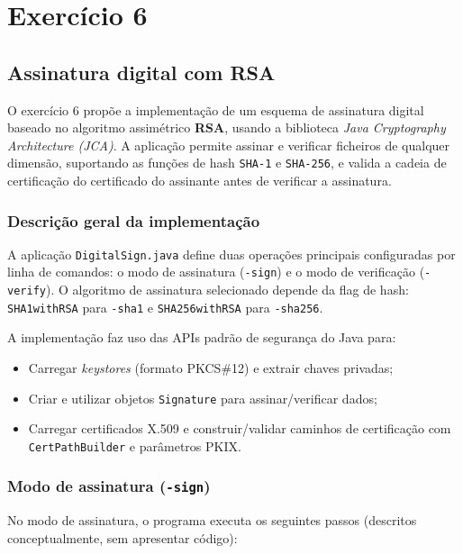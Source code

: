 \chapter{Exercício 6}
\label{cha:exercise_6}

\section{Assinatura digital com RSA}

O exercício 6 propõe a implementação de um esquema de assinatura digital baseado no algoritmo assimétrico \textbf{RSA}, usando a biblioteca \textit{Java Cryptography Architecture (JCA)}.  
A aplicação permite assinar e verificar ficheiros de qualquer dimensão, suportando as funções de hash \texttt{SHA-1} e \texttt{SHA-256}, e valida a cadeia de certificação do certificado do assinante antes de verificar a assinatura.

\subsection{Descrição geral da implementação}

A aplicação \texttt{DigitalSign.java} define duas operações principais configuradas por linha de comandos: o modo de assinatura (\texttt{-sign}) e o modo de verificação (\texttt{-verify}).  
O algoritmo de assinatura selecionado depende da flag de hash: \texttt{SHA1withRSA} para \texttt{-sha1} e \texttt{SHA256withRSA} para \texttt{-sha256}.

A implementação faz uso das APIs padrão de segurança do Java para:
\begin{itemize}
    \item Carregar \textit{keystores} (formato PKCS\#12) e extrair chaves privadas;
    \item Criar e utilizar objetos \texttt{Signature} para assinar/verificar dados;
    \item Carregar certificados X.509 e construir/validar caminhos de certificação com \texttt{CertPathBuilder} e parâmetros PKIX.
\end{itemize}

\subsection{Modo de assinatura (\texttt{-sign})}

No modo de assinatura, o programa executa os seguintes passos (descritos conceptualmente, sem apresentar código):

